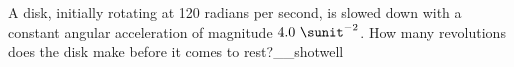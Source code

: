 A disk, initially rotating at 120 radians per second, is slowed down with a
constant angular acceleration of magnitude $4.0\ \sunit^{-2}$. How many
revolutions does the disk make before it comes to rest?__shotwell\answercheck
